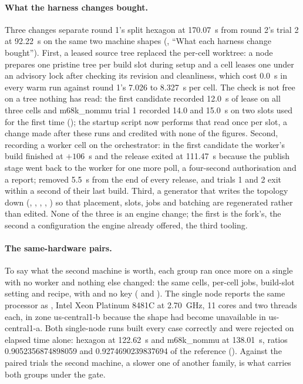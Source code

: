 \paragraph{What the harness changes bought.}
Three changes separate round 1's split hexagon at 170.07~s from round 2's
trial 2 at 92.22~s on the same two machine shapes
(, ``What each harness change bought'').
First, a leased source tree replaced the per-cell worktree: a node prepares
one pristine tree per build slot during setup and a cell leases one under an
advisory lock after checking its revision and cleanliness, which cost 0.0~s in
every warm run against round 1's 7.026 to 8.327~s per cell. The check is not
free on a tree nothing has read: the first candidate recorded 12.0~s of lease
on all three cells and m68k\_nommu trial 1 recorded 14.0 and 15.0~s on two
slots used for the first time (); the startup script now
performs that read once per slot, a change made after these runs and credited
with none of the figures. Second, recording a worker cell on the orchestrator:
in the first candidate the worker's build finished at $+106$~s and the release
exited at 111.47~s because the publish stage went back to the worker for one
more poll, a four-second authorisation and a report;  removed 5.5~s from the end of every release, and trials 1 and 2
exit within a second of their last build. Third, a generator that writes the
topology down (, ,
, , ) so that
placement, slots, jobs and batching are regenerated rather than edited. None of
the three is an engine change; the first is the fork's, the second a
configuration the engine already offered, the third tooling.

\paragraph{The same-hardware pairs.}
To say what the second machine is worth, each group ran once more on a single
 with no worker and nothing else changed: the same cells,
per-cell jobs, build-slot setting and recipe, with  and no  key
( and
). The single node reports the same
processor as , Intel Xeon Platinum 8481C at 2.70~GHz, 11 cores
and two threads each, in zone us-central1-b because the shape had become
unavailable in us-central1-a. Both single-node runs built every case correctly
and were rejected on elapsed time alone: hexagon at 122.62~s and m68k\_nommu
at 138.01~s, ratios 0.9052356874898059 and 0.9274690239837694 of the reference
(). Against the paired trials the second machine, a
slower one of another family, is what carries both groups under the gate.

